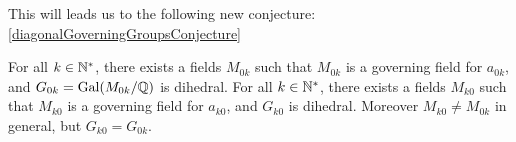 This will leads us to the following new conjecture:
\ref{diagonalGoverningGroupsConjecture}
\begin{conjecture}
	For all $k \in \mathbb{N}^*$, there exists a fields $M_{0k}$ such that $M_{0k}$ is a governing field for $a_{0k}$, and $G_{0k} = \text{Gal}(M_{0k}/\mathbb{Q})$ is dihedral.
	For all $k \in \mathbb{N}^*$, there exists a fields $M_{k0}$ such that $M_{k0}$ is a governing field for $a_{k0}$, and $G_{k0}$ is dihedral.
	Moreover $M_{k0} \neq M_{0k}$ in general, but $G_{k0} = G_{0k}$.
\end{conjecture}
